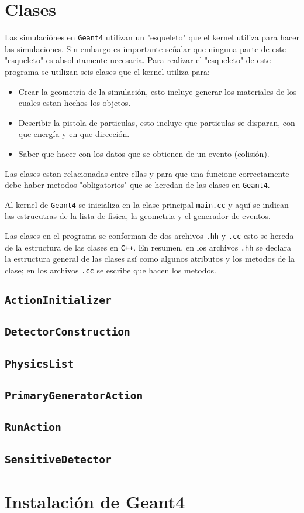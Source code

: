 \documentclass[a4paper,10pt]{article}
\begin{document}
    \section{Clases}
        Las simulaciónes en \verb|Geant4| utilizan un "esqueleto" que el kernel utiliza para hacer las simulaciones. Sin embargo es importante señalar que ninguna parte de este "esqueleto" es absolutamente necesaria.
	Para realizar el "esqueleto" de este programa se utilizan seis clases que el kernel utiliza para:
	
	\begin{itemize}
		\item Crear la geometría de la simulación, esto incluye generar los materiales de los cuales estan hechos los objetos.
		\item Describir la pistola de particulas, esto incluye que particulas se disparan, con que energía y en que dirección.
		\item Saber que hacer con los datos que se obtienen de un evento (colisión).
	\end{itemize}

	Las clases estan relacionadas entre ellas y para que una funcione correctamente debe haber metodos "obligatorios" que se heredan de las clases en \verb|Geant4|.

	Al kernel de \verb|Geant4| se inicializa en la clase principal \verb|main.cc| y aquí se indican las estrucutras de la lista de fisica, la geometria y el generador de eventos.

	Las clases en el programa se conforman de dos archivos \verb|.hh| y \verb|.cc| esto se hereda de la estructura de las clases en \verb|C++|. En resumen, en los archivos \verb|.hh| se declara la estructura general de las clases así como algunos atributos y los metodos de la clase; en los archivos \verb|.cc| se escribe que hacen los metodos.
	
	\subsection{\verb|ActionInitializer|}
	\subsection{\verb|DetectorConstruction|}
	\subsection{\verb|PhysicsList|}
	\subsection{\verb|PrimaryGeneratorAction|}
	\subsection{\verb|RunAction|}
	\subsection{\verb|SensitiveDetector|}

    \appendix
        \section{Instalación de Geant4}
\end{document}
